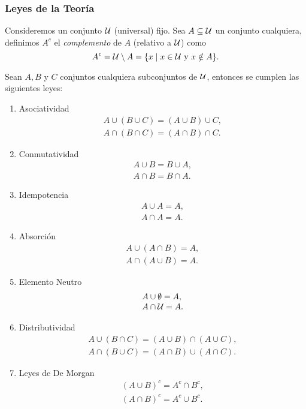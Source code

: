 \subsubsection*{Leyes de la Teoría}
Consideremos un conjunto $\mathcal{U}$ (universal) fijo.
Sea $A\subseteq\mathcal{U}$ un conjunto cualquiera, definimos $A^c$ el \emph{complemento} de $A$ (relativo a $\mathcal{U}$) como
\[
A^c=\mathcal{U}\setminus A=\{x\;|\;x\in\mathcal{U}\text{ y } x\notin A\}.
\]

\begin{teorema}
Sean $A,B$ y $C$ conjuntos cualquiera subconjuntos de $\mathcal{U}$, entonces se cumplen las siguientes leyes:
\begin{multicols}{2}
\begin{enumerate}
  \itemsep 0pt
  \item Asociatividad
  \[
  \begin{array}{l}
  A\cup(B\cup C)=(A\cup B)\cup C, \\
  A\cap(B\cap C)=(A\cap B)\cap C.
  \end{array}
  \]
  \item Conmutatividad
  \[
  \begin{array}{l}
  A\cup B=B\cup A,\\
  A\cap B=B\cap A.
  \end{array}
  \]
  \item Idempotencia
  \[
  \begin{array}{l}
  A\cup A=A, \\ A\cap A=A.
  \end{array}
  \]
  \item Absorción
  \[
  \begin{array}{l}
  A\cup(A\cap B)=A,\\ A\cap(A\cup B)=A.
  \end{array}
  \]
  \item Elemento Neutro
  \[
  \begin{array}{l}
  A\cup\emptyset=A,\\ A\cap\mathcal{U}=A.
  \end{array}
  \]
  \item Distributividad
  \[
  \begin{array}{l}
  A\cup(B\cap C)=(A\cup B)\cap(A\cup C),\\ A\cap(B\cup C)=(A\cap B)\cup(A\cap C).
  \end{array}
  \]
  \item Leyes de De Morgan
  \[
  \begin{array}{l}
  (A\cup B)^c=A^c\cap B^c,\\ (A\cap B)^c=A^c\cup B^c.
  \end{array}
  \]
  

\end{enumerate}
\end{multicols}
\end{teorema}
